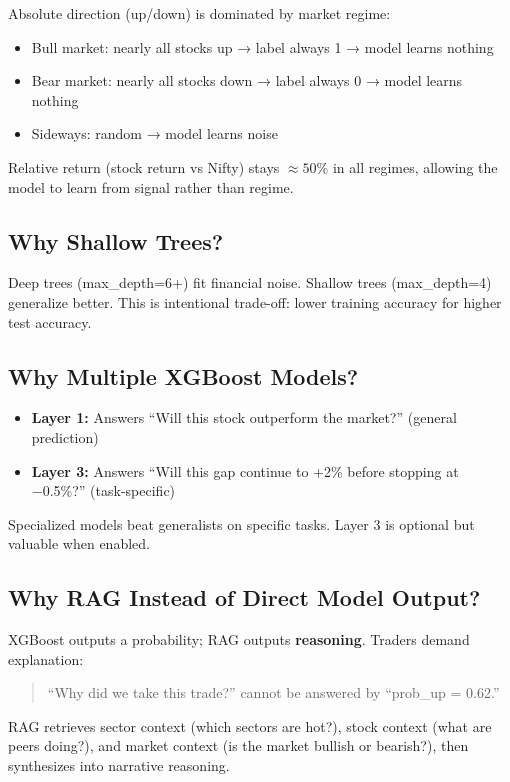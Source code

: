 \documentclass[11pt,a4paper]{article}
\begin{document}
Absolute direction (up/down) is dominated by market regime:
\begin{itemize}
    \item Bull market: nearly all stocks up → label always 1 → model learns nothing
    \item Bear market: nearly all stocks down → label always 0 → model learns nothing
    \item Sideways: random → model learns noise
\end{itemize}

Relative return (stock return vs Nifty) stays $\approx 50\%$ in all regimes, allowing the model to learn from signal rather than regime.

\subsection{Why Shallow Trees?}

Deep trees (max\_depth=6+) fit financial noise. Shallow trees (max\_depth=4) generalize better. This is intentional trade-off: lower training accuracy for higher test accuracy.

\subsection{Why Multiple XGBoost Models?}

\begin{itemize}
    \item \textbf{Layer 1:} Answers ``Will this stock outperform the market?'' (general prediction)
    \item \textbf{Layer 3:} Answers ``Will this gap continue to +2\% before stopping at −0.5\%?'' (task-specific)
\end{itemize}

Specialized models beat generalists on specific tasks. Layer 3 is optional but valuable when enabled.

\subsection{Why RAG Instead of Direct Model Output?}

XGBoost outputs a probability; RAG outputs \textbf{reasoning}. Traders demand explanation:
\begin{quote}
``Why did we take this trade?'' cannot be answered by ``prob\_up = 0.62.''
\end{quote}

RAG retrieves sector context (which sectors are hot?), stock context (what are peers doing?), and market context (is the market bullish or bearish?), then synthesizes into narrative reasoning.
\end{document}
